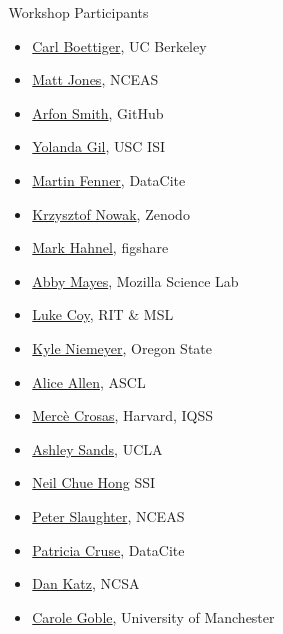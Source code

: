 \documentclass[final,hyperref={pdfpagelabels=false},xcolor=svgnames]{beamer}
\begin{document}
\begin{frame}[t,fragile]
\begin{columns}[t]
\begin{column}{.33\paperwidth}
         \vspace{5cm}
    \begin{columns}
      \begin{column}{.10\paperwidth}
      \end{column}      
      \begin{column}{.20\paperwidth}
          {\LARGE Workshop Participants} \\
        \begin{itemize}
        \item \href{http://carlboettiger.info}{Carl Boettiger}, UC Berkeley
        \item \href{https://twitter.com/metamattj}{Matt Jones}, NCEAS
        \item \href{http://www.arfon.org/}{Arfon Smith}, GitHub
        \item \href{http://www.isi.edu/~gil/}{Yolanda Gil}, USC ISI
        \item \href{https://twitter.com/mfenner}{Martin Fenner}, DataCite
        \item \href{https://github.com/krzysztof}{Krzysztof Nowak}, Zenodo
        \item \href{https://twitter.com/markhahnel?lang=en}{Mark Hahnel}, figshare
        \item \href{https://twitter.com/abbycabs}{Abby Mayes}, Mozilla Science Lab
        \item \href{http://lukecoy.github.io/}{Luke Coy}, RIT \& MSL
        \item \href{http://kyleniemeyer.com/}{Kyle Niemeyer}, Oregon State
        \item \href{https://twitter.com/asclnet}{Alice Allen}, ASCL
        \item \href{http://scholar.harvard.edu/mercecrosas}{Mercè Crosas}, Harvard, IQSS
        \item \href{https://knowledgeinfrastructures.gseis.ucla.edu/?page_id=62\#Sands}{Ashley Sands}, UCLA
        \item \href{https://twitter.com/npch}{Neil Chue Hong} SSI
        \item \href{https://github.com/sbpcs59}{Peter Slaughter}, NCEAS
        \item \href{https://www.datacite.org/news/datacite-appoints-patricia-cruse-executive-director.html}{Patricia Cruse}, DataCite
        \item \href{http://danielskatz.org/}{Dan Katz}, NCSA
        \item \href{http://www.manchester.ac.uk/research/Carole.goble/}{Carole Goble}, University of Manchester
        \end{itemize}
      \end{column}
    \end{columns}


\end{column}
\end{columns}
\end{frame}
\end{document}

